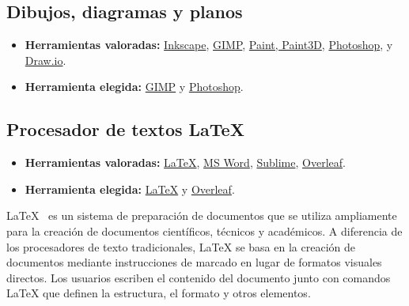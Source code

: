 \subsection{Dibujos, diagramas y planos}\label{4:plataformasDibujosYPlanos}

\begin{itemize}
	\item \textbf{Herramientas valoradas:} \href{https://inkscape.org/}{Inkscape}, \href{https://www.gimp.org/}{GIMP}, \href{https://support.microsoft.com/es-es/windows/obtener-microsoft-paint-a6b9578c-ed1c-5b09-0699-4ed8115f9aa9}{Paint, Paint3D}, \href{https://www.adobe.com/es/products/photoshop.html}{Photoshop}, y \href{www.draw.io}{Draw.io}.
	\item \textbf{Herramienta elegida:} \href{https://www.gimp.org/}{GIMP} y \href{https://www.adobe.com/es/products/photoshop.html}{Photoshop}.
\end{itemize}


\subsection{Procesador de textos \LaTeX}\label{4:latex}
\begin{itemize}
    \item \textbf{Herramientas valoradas:} \href{https://www.latex-project.org/}{\LaTeX}, \href{https://www.microsoft.com/es-es/microsoft-365/word}{MS Word}, \href{https://www.sublimetext.com/}{Sublime}, \href{https://www.overleaf.com/}{Overleaf}.
    \item \textbf{Herramienta elegida:} \href{https://www.latex-project.org/}{\LaTeX} y \href{https://www.overleaf.com/}{Overleaf}.
\end{itemize}
\LaTeX{}~\cite{misc:Latex} es un sistema de preparación de documentos que se utiliza ampliamente para la creación de documentos científicos, técnicos y académicos. A diferencia de los procesadores de texto tradicionales, LaTeX se basa en la creación de documentos mediante instrucciones de marcado en lugar de formatos visuales directos. Los usuarios escriben el contenido del documento junto con comandos LaTeX que definen la estructura, el formato y otros elementos.

